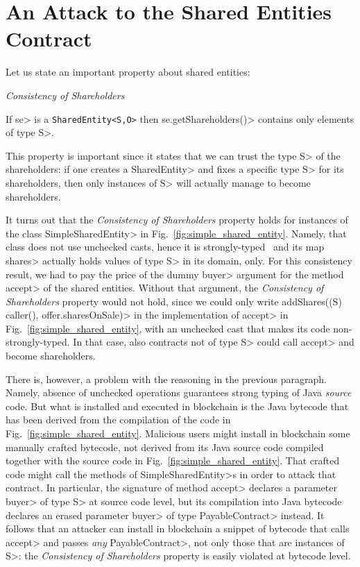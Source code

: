 \section{An Attack to the Shared Entities Contract}\label{sec:attack}

Let us state an important property about shared entities:
%
\vspace{2ex}
\begin{mdframed}[leftmargin=10pt,rightmargin=10pt]
  \begin{center}\emph{Consistency of Shareholders}\end{center}
  \noindent
  If \<se> is a {\codesize\texttt{SharedEntity<S,O>}}
  then \<se.getShareholders()> contains only elements of type \<S>.
\end{mdframed}
\vspace{2ex}
%
This property is important since it states that we can trust the type \<S> of
the shareholders: if one creates a \<SharedEntity> and fixes a specific type \<S>
for its shareholders, then only instances of \<S> will actually manage to become shareholders.

It turns out that the \emph{Consistency of Shareholders} property holds
for instances of the class \<SimpleSharedEntity> in Fig.~\ref{fig:simple_shared_entity}.
Namely, that class does not use unchecked casts, hence it is strongly-typed~\cite{NaftalinW06} and
its map \<shares> actually holds values of type \<S> in its domain, only.
For this consistency result, we had to pay the price
of the dummy \<buyer> argument for the method \<accept>
of the shared entities. Without that argument, the
\emph{Consistency of Shareholders} property would not hold, since we could only write
\<addShares((S) caller(), offer.sharesOnSale)> in the implementation of \<accept> in
Fig.~\ref{fig:simple_shared_entity}, with an unchecked cast that makes its code
non-strongly-typed. In that case, also contracts not of type \<S> could call \<accept>
and become shareholders.

There is, however, a problem with the reasoning
in the previous paragraph. Namely, absence of unchecked
operations guarantees strong typing of Java \emph{source} code. But what is installed
and executed in blockchain is the Java bytecode that has been derived from
the compilation of the code in Fig.~\ref{fig:simple_shared_entity}.
Malicious users might install in blockchain some manually crafted bytecode,
not derived from its Java source code compiled together with the source code
in Fig.~\ref{fig:simple_shared_entity}.
That crafted code might
call the methods of \<SimpleSharedEntity>s in order to attack
that contract. In particular,
the signature of method \<accept> declares a parameter \<buyer> of type \<S> at source code level, but
its compilation into Java bytecode declares an erased
parameter \<buyer> of type \<PayableContract> instead.
It follows that an attacker can install in blockchain a snippet of bytecode that calls
\<accept> and passes \emph{any} \<PayableContract>, not only those that are instances of \<S>:
the \emph{Consistency of Shareholders} property is easily violated at bytecode level.

